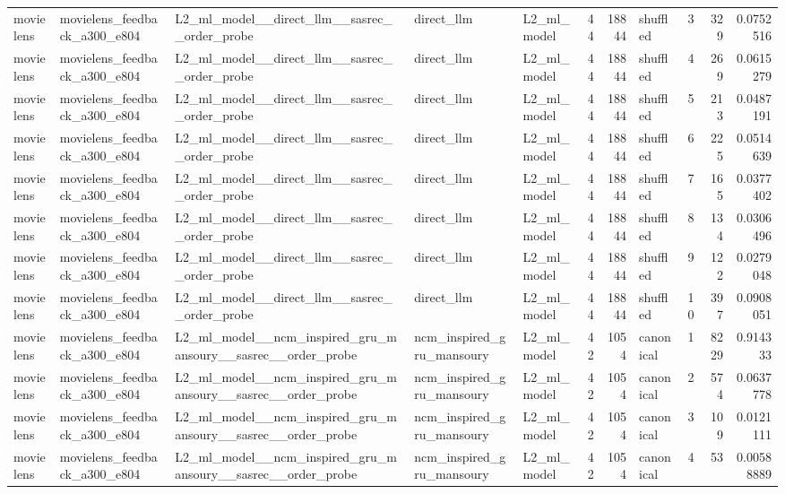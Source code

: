 \begin{table}[htbp!]
\begin{tabular}{lllllrrlrrr}
movielens & movielens\_feedback\_a300\_e804 & L2\_ml\_model\_\_direct\_llm\_\_sasrec\_\_order\_probe & direct\_llm & L2\_ml\_model & 44 & 18844 & shuffled & 3 & 329 & 0.0752516 \\
movielens & movielens\_feedback\_a300\_e804 & L2\_ml\_model\_\_direct\_llm\_\_sasrec\_\_order\_probe & direct\_llm & L2\_ml\_model & 44 & 18844 & shuffled & 4 & 269 & 0.0615279 \\
movielens & movielens\_feedback\_a300\_e804 & L2\_ml\_model\_\_direct\_llm\_\_sasrec\_\_order\_probe & direct\_llm & L2\_ml\_model & 44 & 18844 & shuffled & 5 & 213 & 0.0487191 \\
movielens & movielens\_feedback\_a300\_e804 & L2\_ml\_model\_\_direct\_llm\_\_sasrec\_\_order\_probe & direct\_llm & L2\_ml\_model & 44 & 18844 & shuffled & 6 & 225 & 0.0514639 \\
movielens & movielens\_feedback\_a300\_e804 & L2\_ml\_model\_\_direct\_llm\_\_sasrec\_\_order\_probe & direct\_llm & L2\_ml\_model & 44 & 18844 & shuffled & 7 & 165 & 0.0377402 \\
movielens & movielens\_feedback\_a300\_e804 & L2\_ml\_model\_\_direct\_llm\_\_sasrec\_\_order\_probe & direct\_llm & L2\_ml\_model & 44 & 18844 & shuffled & 8 & 134 & 0.0306496 \\
movielens & movielens\_feedback\_a300\_e804 & L2\_ml\_model\_\_direct\_llm\_\_sasrec\_\_order\_probe & direct\_llm & L2\_ml\_model & 44 & 18844 & shuffled & 9 & 122 & 0.0279048 \\
movielens & movielens\_feedback\_a300\_e804 & L2\_ml\_model\_\_direct\_llm\_\_sasrec\_\_order\_probe & direct\_llm & L2\_ml\_model & 44 & 18844 & shuffled & 10 & 397 & 0.0908051 \\
movielens & movielens\_feedback\_a300\_e804 & L2\_ml\_model\_\_ncm\_inspired\_gru\_mansoury\_\_sasrec\_\_order\_probe & ncm\_inspired\_gru\_mansoury & L2\_ml\_model & 42 & 1054 & canonical & 1 & 8229 & 0.914333 \\
movielens & movielens\_feedback\_a300\_e804 & L2\_ml\_model\_\_ncm\_inspired\_gru\_mansoury\_\_sasrec\_\_order\_probe & ncm\_inspired\_gru\_mansoury & L2\_ml\_model & 42 & 1054 & canonical & 2 & 574 & 0.0637778 \\
movielens & movielens\_feedback\_a300\_e804 & L2\_ml\_model\_\_ncm\_inspired\_gru\_mansoury\_\_sasrec\_\_order\_probe & ncm\_inspired\_gru\_mansoury & L2\_ml\_model & 42 & 1054 & canonical & 3 & 109 & 0.0121111 \\
movielens & movielens\_feedback\_a300\_e804 & L2\_ml\_model\_\_ncm\_inspired\_gru\_mansoury\_\_sasrec\_\_order\_probe & ncm\_inspired\_gru\_mansoury & L2\_ml\_model & 42 & 1054 & canonical & 4 & 53 & 0.00588889 \\

\end{tabular}
\end{table}
